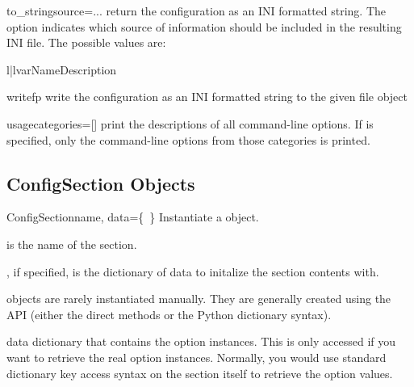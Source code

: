 \begin{methoddesc}[ConfigManager]{to_string}{source=...}
return the configuration as an INI formatted string.  The 
option indicates which source of information should be included in
the resulting INI file.  The possible values are:
\begin{tableii}{l|l}{var}{Name}{Description}
\end{tableii}
\end{methoddesc}

\begin{methoddesc}[ConfigManager]{write}{fp}
write the configuration as an INI formatted string to the given file object
\end{methoddesc}

\begin{methoddesc}[ConfigManager]{usage}{categories=[]}
print the descriptions of all command-line options.  If 
is specified, only the command-line options from those categories is printed.
\end{methoddesc}


\subsection{ConfigSection Objects}

\begin{classdesc}{ConfigSection}{name, data=\{~\}}
Instantiate a  object.  

 is the name of the section.

, if specified, is the dictionary of data to initalize
the section contents with.
\end{classdesc}

 objects are rarely instantiated manually.  They 
are generally created using the  API (either the 
direct methods or the Python dictionary syntax).

\begin{memberdesc}[ConfigSection]{data}
dictionary that contains the option instances.  This is only accessed
if you want to retrieve the real option instances.  Normally, you would
use standard dictionary key access syntax on the section itself to
retrieve the option values.
\end{memberdesc}

